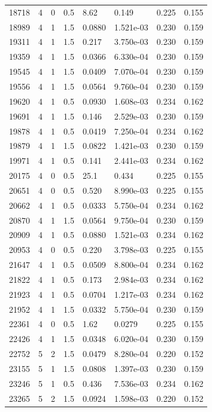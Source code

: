 \documentclass[preview]{standalone}
\begin{document}
{{{\begin{tabular}{L{1.2cm}C{1.2cm} C{0.3cm}C{0.5cm} C{1.4cm}C{1.4cm} C{1.4cm}C{1.4cm}}
  18718  &     4  & 0     & 0.5 &  8.62  & 0.149  & 0.225 &  0.155   \\ 
  18989  &     4  & 1     & 1.5 &  0.0880  & 1.521e-03  & 0.230 &  0.159   \\ 
  19311  &     4  & 1     & 1.5 &  0.217  & 3.750e-03  & 0.230 &  0.159   \\ 
  19359  &     4  & 1     & 1.5 &  0.0366  & 6.330e-04  & 0.230 &  0.159   \\ 
  19545  &     4  & 1     & 1.5 &  0.0409  & 7.070e-04  & 0.230 &  0.159   \\ 
  19556  &     4  & 1     & 1.5 &  0.0564  & 9.760e-04  & 0.230 &  0.159   \\ 
  19620  &     4  & 1     & 0.5 &  0.0930  & 1.608e-03  & 0.234 &  0.162   \\ 
  19691  &     4  & 1     & 1.5 &  0.146  & 2.529e-03  & 0.230 &  0.159   \\ 
  19878  &     4  & 1     & 0.5 &  0.0419  & 7.250e-04  & 0.234 &  0.162   \\ 
  19879  &     4  & 1     & 1.5 &  0.0822  & 1.421e-03  & 0.230 &  0.159   \\ 
  19971  &     4  & 1     & 0.5 &  0.141  & 2.441e-03  & 0.234 &  0.162   \\ 
  20175  &     4  & 0     & 0.5 &  25.1  & 0.434  & 0.225 &  0.155   \\ 
  20651  &     4  & 0     & 0.5 &  0.520  & 8.990e-03  & 0.225 &  0.155   \\ 
  20662  &     4  & 1     & 0.5 &  0.0333  & 5.750e-04  & 0.234 &  0.162   \\ 
  20870  &     4  & 1     & 1.5 &  0.0564  & 9.750e-04  & 0.230 &  0.159   \\ 
  20909  &     4  & 1     & 0.5 &  0.0880  & 1.521e-03  & 0.234 &  0.162   \\ 
  20953  &     4  & 0     & 0.5 &  0.220  & 3.798e-03  & 0.225 &  0.155   \\ 
  21647  &     4  & 1     & 0.5 &  0.0509  & 8.800e-04  & 0.234 &  0.162   \\ 
  21822  &     4  & 1     & 0.5 &  0.173  & 2.984e-03  & 0.234 &  0.162   \\ 
  21923  &     4  & 1     & 0.5 &  0.0704  & 1.217e-03  & 0.234 &  0.162   \\ 
  21952  &     4  & 1     & 1.5 &  0.0332  & 5.750e-04  & 0.230 &  0.159   \\ 
  22361  &     4  & 0     & 0.5 &  1.62  & 0.0279  & 0.225 &  0.155   \\ 
  22426  &     4  & 1     & 1.5 &  0.0348  & 6.020e-04  & 0.230 &  0.159   \\ 
  22752  &     5  & 2     & 1.5 &  0.0479  & 8.280e-04  & 0.220 &  0.152   \\ 
  23155  &     5  & 1     & 1.5 &  0.0808  & 1.397e-03  & 0.230 &  0.159   \\ 
  23246  &     5  & 1     & 0.5 &  0.436  & 7.536e-03  & 0.234 &  0.162   \\ 
  23265  &     5  & 2     & 1.5 &  0.0924  & 1.598e-03  & 0.220 &  0.152   \\ 
\hline 
\end{tabular} 

}}}
\end{document}
